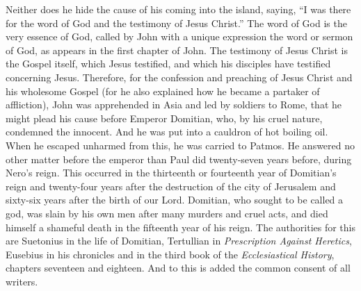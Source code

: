 Neither does he hide the cause of his coming into the island, saying, “I was there for the word of God and the testimony of Jesus Christ.” The word of God is the very essence of God, called by John with a unique expression the word or sermon of God, as appears in the first chapter of John. The testimony of Jesus Christ is the Gospel itself, which Jesus testified, and which his disciples have testified concerning Jesus. Therefore, for the confession and preaching of Jesus Christ and his wholesome Gospel (for he also explained how he became a partaker of affliction), John was apprehended in Asia and led by soldiers to Rome, that he might plead his cause before Emperor Domitian, who, by his cruel nature, condemned the innocent. And he was put into a cauldron of hot boiling oil. When he escaped unharmed from this, he was carried to Patmos. He answered no other matter before the emperor than Paul did twenty-seven years before, during Nero’s reign. This occurred in the thirteenth or fourteenth year of Domitian’s reign and twenty-four years after the destruction of the city of Jerusalem and sixty-six years after the birth of our Lord. Domitian, who sought to be called a god, was slain by his own men after many murders and cruel acts, and died himself a shameful death in the fifteenth year of his reign. The authorities for this are Suetonius in the life of Domitian, Tertullian in \textit{Prescription Against Heretics}, Eusebius in his chronicles and in the third book of the \textit{Ecclesiastical History}, chapters seventeen and eighteen. And to this is added the common consent of all writers.

